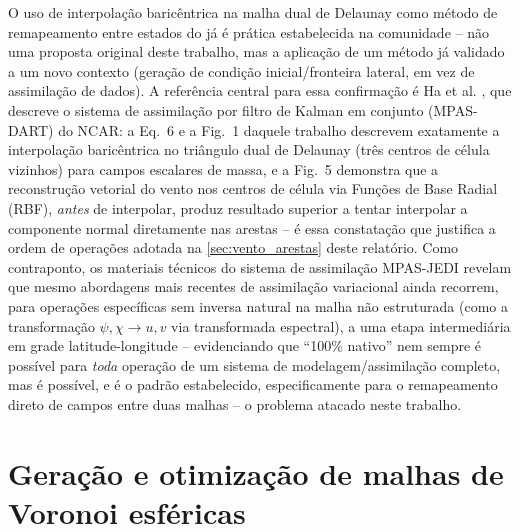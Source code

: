 O uso de interpolação baricêntrica na malha dual de Delaunay como método
de remapeamento entre estados do \mpasa{} já é prática estabelecida na
comunidade -- não uma proposta original deste trabalho, mas a aplicação
de um método já validado a um novo contexto (geração de condição
inicial/fronteira lateral, em vez de assimilação de dados). A referência
central para essa confirmação é Ha et al.
\cite{ha2017enkf}, que descreve o sistema de assimilação por
filtro de Kalman em conjunto (MPAS-DART) do NCAR: a Eq.~6 e a Fig.~1
daquele trabalho descrevem exatamente a interpolação baricêntrica no
triângulo dual de Delaunay (três centros de célula vizinhos) para campos
escalares de massa, e a Fig.~5 demonstra que a reconstrução vetorial do
vento nos centros de célula via Funções de Base Radial (RBF),
\emph{antes} de interpolar, produz resultado superior a tentar
interpolar a componente normal diretamente nas arestas -- é essa
constatação que justifica a ordem de operações adotada na
\cref{sec:vento_arestas} deste relatório. Como contraponto, os materiais
técnicos do sistema de assimilação MPAS-JEDI \cite{mpasjedi2021staticb}
revelam que mesmo abordagens mais recentes de assimilação variacional
ainda recorrem, para operações específicas sem inversa natural na malha
não estruturada (como a transformação $\psi,\chi \to u,v$ via
transformada espectral), a uma etapa intermediária em grade
latitude-longitude -- evidenciando que ``100\% nativo'' nem sempre é
possível para \emph{toda} operação de um sistema de modelagem/assimilação
completo, mas é possível, e é o padrão estabelecido, especificamente para
o remapeamento direto de campos entre duas malhas -- o problema atacado
neste trabalho.

\section{Geração e otimização de malhas de Voronoi esféricas}

